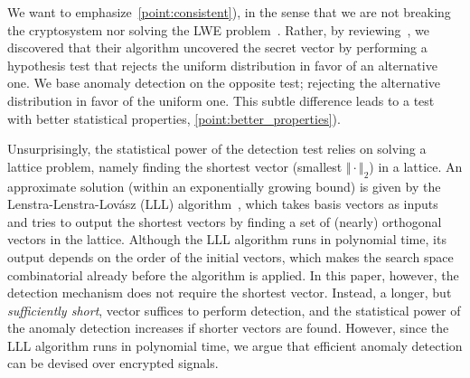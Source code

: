 \documentclass[journal, twoside, web]{ieeecolorpreprint}
\begin{document}
We want to emphasize~\ref{point:consistent}), in the sense that we are not breaking the cryptosystem nor solving the LWE problem~\cite{regev2009}. Rather, by reviewing~\cite{regev2009}, we discovered that their algorithm uncovered the secret vector by performing a hypothesis test that rejects the uniform distribution in favor of an alternative one. We base anomaly detection on the opposite test; rejecting the alternative distribution in favor of the uniform one. This subtle difference leads to a test with better statistical properties, \ref{point:better_properties}).

Unsurprisingly, the statistical power of the detection test relies on solving a lattice problem, namely finding the shortest vector (smallest $\Vert \cdot \Vert_2$) in a lattice. An approximate solution (within an exponentially growing bound) is given by the  Lenstra-Lenstra-Lov\'asz (LLL) algorithm~\cite{lenstra1982}, which takes basis vectors as inputs and tries to output the shortest vectors by finding a set of (nearly) orthogonal vectors in the lattice. Although the LLL algorithm runs in polynomial time, its output depends on the order of the initial vectors, which makes the search space combinatorial already before the algorithm is applied. In this paper, however, the detection mechanism does not require the shortest vector. Instead, a longer, but \textit{sufficiently short}, vector suffices to perform detection, and the statistical power of the anomaly detection increases if shorter vectors are found. However, since the LLL algorithm runs in polynomial time, we argue that efficient anomaly detection can be devised over encrypted signals.


\end{document}
